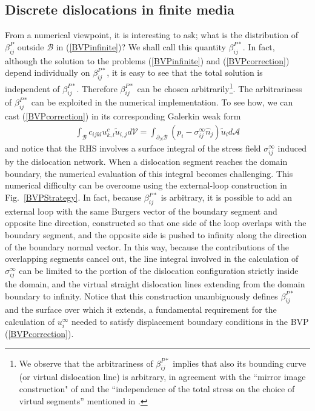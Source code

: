 





\subsection{Discrete dislocations in finite media}

From a numerical viewpoint, it is interesting to ask; what is the distribution of $\beta^P_{ij}$ outside $\mathcal{B}$ in (\ref{BVPinfinite})? We shall call this quantity $\beta^{P*}_{ij}$. In fact, although the solution to the problems (\ref{BVPinfinite}) and (\ref{BVPcorrection}) depend individually on $\beta^{P*}_{ij}$, it is easy to see that the total solution is independent of  $\beta^{P*}_{ij}$. Therefore $\beta^{P*}_{ij}$ can be chosen arbitrarily\footnote{We observe that the arbitrariness of $\beta^{P*}_{ij}$ implies that also its bounding curve (or virtual dislocation line) is arbitrary, in agreement with the ``mirror image construction" of \cite{Weygand:2002tq}  and the ``independence of the total stress on the choice of virtual segments'' mentioned in \cite{Weinberger:2009fk}.}.  The arbitrariness of $\beta^{P*}_{ij}$ can be exploited in the numerical implementation. To see how, we can cast  (\ref{BVPcorrection}) in its   corresponding Galerkin weak form
\begin{align}
\int_\mathcal{B}c_{ijkl}u^c_{k,l}\tilde{u}_{i,j}d\mathcal{V}=\int_{\partial_N\mathcal{B}}\left(p_i- \sigma^\infty_{ij}\hat{n}_j\right)\tilde{u}_id\mathcal{A}
\label{BVPcorrectionWeak}
\end{align} 
and notice that the RHS involves a surface integral  of the stress field  $\sigma^\infty_{ij}$ induced by the dislocation network. When a dislocation segment reaches the domain boundary, the numerical evaluation of this integral becomes challenging. This numerical difficulty can be  overcome using the external-loop construction in Fig.~\ref{BVPStrategy}. In fact, because $\beta^{P*}_{ij}$ is arbitrary, it is possible to add an external loop with the same Burgers vector of the boundary segment and opposite line direction, constructed so that one side of the loop overlaps with the boundary segment, and the opposite side is pushed to infinity along the direction of the boundary normal vector. In this way, because the contributions of the overlapping segments cancel out, the line integral involved in the calculation of $\sigma^{\infty}_{ij}$ can be limited to the portion of the dislocation configuration strictly inside the domain, and the virtual straight dislocation lines extending from the domain boundary to infinity. Notice that this construction unambiguously defines $\beta^{P*}_{ij}$ and the surface over which it extends, a fundamental requirement for the calculation of $u^\infty_i$ needed to satisfy displacement boundary conditions in the BVP (\ref{BVPcorrection}).

